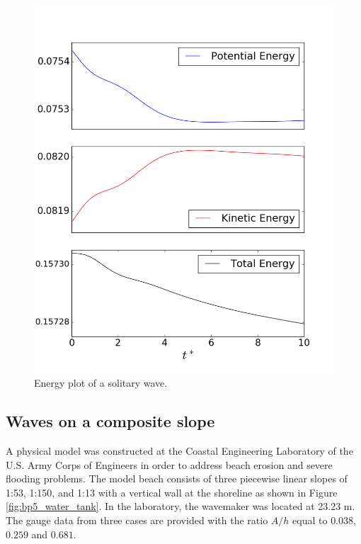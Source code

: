 \documentclass[review]{elsarticle}
\begin{document}
\begin{figure}[!htb]
\centering
\includegraphics[width=.7\textwidth]{_fig/soliton_energy.png}
\caption{Energy plot of a solitary wave.}
\label{fig:soliton_energy}
\end{figure}

\subsection{Waves on a composite slope}

A physical model was constructed at the Coastal Engineering Laboratory of the U.S. Army Corps of Engineers
in order to address beach erosion and severe flooding problems.
The model beach consists of three piecewise linear slopes of 1:53, 1:150, and 1:13 with a vertical wall at the shoreline as shown in Figure \ref{fig:bp5_water_tank}.
In the laboratory, the wavemaker was located at 23.23 m.
The gauge data from three cases are provided 
with the ratio $A/h$ equal to $0.038$, $0.259$ and $0.681$.
\end{document}
